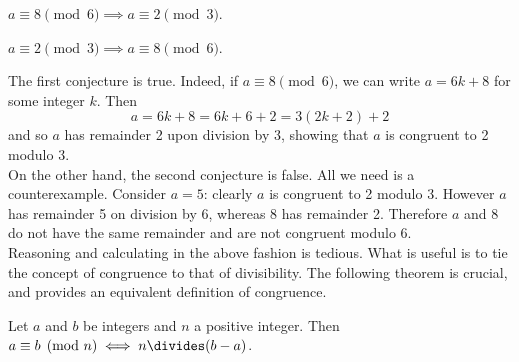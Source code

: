 \begin{conj}
$a\equiv 8\pmod 6\implies a\equiv 2\pmod 3$.
\end{conj}

\begin{conj}
$a\equiv 2\pmod 3\implies a\equiv 8\pmod 6$.
\end{conj}

\noindent The first conjecture is true. Indeed, if $a\equiv 8\pmod 6$, we can write $a=6k+8$ for some integer $k$. Then
\[a=6k+8=6k+6+2=3(2k+2)+2\]
and so $a$ has remainder 2 upon division by 3, showing that $a$ is congruent to 2 modulo 3.\\
On the other hand, the second conjecture is false. All we need is a counterexample. Consider $a=5$: clearly $a$ is congruent to 2 modulo 3. However $a$ has remainder 5 on division by 6, whereas 8 has remainder 2. Therefore $a$ and 8 do not have the same remainder and are not congruent modulo 6.\\

\noindent Reasoning and calculating in the above fashion is tedious. What is useful is to tie the concept of congruence to that of divisibility. The following theorem is crucial, and provides an equivalent definition of congruence. 

\begin{thm}\label{thm:congdiv}
Let $a$ and $b$ be integers and $n$ a positive integer. Then $a\equiv b\pmod n\iff n\divides (b-a)$.
\end{thm}


